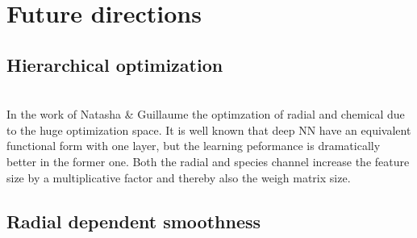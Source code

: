 \section{Future directions}
\subsection{Hierarchical optimization}
\\
In the work of Natasha \& Guillaume the optimzation of radial and chemical due to the huge optimization space.
It is well known that deep NN have an equivalent functional form with one layer, but the learning peformance is dramatically better in the former one.
Both the radial and species channel increase the feature size by a multiplicative factor and thereby also the weigh matrix size.
\subsection{Radial dependent smoothness}
